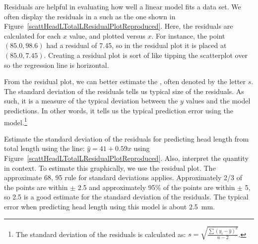 Residuals are helpful in evaluating how well a linear model fits a data set. We often display the residuals in a  such as the one shown in Figure~\ref{scattHeadLTotalLResidualPlotReproduced}.  Here, the residuals are calculated for each $x$ value, and plotted versus $x$.  For instance, the point $(85.0,98.6)$ had a residual of 7.45, so in the residual plot it is placed at $(85.0, 7.45)$. Creating a residual plot is sort of like tipping the scatterplot over so the regression line is horizontal. 

From the residual plot, we can better estimate the , often denoted by the letter $s$. The standard deviation of the residuals tells us  typical size of the residuals.  As such, it is a measure of the typical deviation between the $y$ values and the model predictions.  In other words, it tells us the typical prediction error using the model.\footnote{The standard deviation of the residuals is calculated as:  $s=\sqrt{\frac{\sum{(y_i-\hat{y})^2}}{n-2}}$. }

\D{\newpage}

\begin{examplewrap}
\begin{nexample}{Estimate the standard deviation of the residuals for predicting head length from total length using the line: $\hat{y} = 41+0.59x$ using
Figure~\ref{scattHeadLTotalLResidualPlotReproduced}.
Also, interpret the quantity in context.}
To estimate this graphically, we use the residual plot.  The approximate 68, 95 rule for standard deviations applies.  Approximately 2/3 of the points are within $\pm$ 2.5 and approximately 95\% of the points are within $\pm$ 5, so 2.5 is a good estimate for the standard deviation of the residuals.  The typical error when predicting head length using this model is about 2.5~mm.
\end{nexample}
\end{examplewrap}


